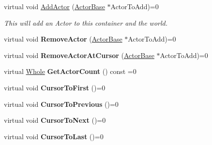\begin{DoxyCompactItemize}
\item 
virtual void \hyperlink{classphys_1_1ActorContainerBase_a8dd213cba4915f68ac421fc9f341cbbe}{AddActor} (\hyperlink{classphys_1_1ActorBase}{ActorBase} $\ast$ActorToAdd)=0
\begin{DoxyCompactList}\small\item\em This will add an Actor to this container and the world. \item\end{DoxyCompactList}\item 
\hypertarget{classphys_1_1ActorContainerBase_a3775dd998c7ed620d4a70b9348d4e067}{
virtual void {\bfseries RemoveActor} (\hyperlink{classphys_1_1ActorBase}{ActorBase} $\ast$ActorToAdd)=0}
\label{d1/d00/classphys_1_1ActorContainerBase_a3775dd998c7ed620d4a70b9348d4e067}

\item 
\hypertarget{classphys_1_1ActorContainerBase_a058d948abcd1bc69a5142e931a67e19b}{
virtual void {\bfseries RemoveActorAtCursor} (\hyperlink{classphys_1_1ActorBase}{ActorBase} $\ast$ActorToAdd)=0}
\label{d1/d00/classphys_1_1ActorContainerBase_a058d948abcd1bc69a5142e931a67e19b}

\item 
\hypertarget{classphys_1_1ActorContainerBase_aa5ec651d4634b2d90efe2a76f9d2fbdd}{
virtual \hyperlink{namespacephys_a460f6bc24c8dd347b05e0366ae34f34a}{Whole} {\bfseries GetActorCount} () const =0}
\label{d1/d00/classphys_1_1ActorContainerBase_aa5ec651d4634b2d90efe2a76f9d2fbdd}

\item 
\hypertarget{classphys_1_1ActorContainerBase_ab1a44758d7c17e70ff2e0f8de47424c3}{
virtual void {\bfseries CursorToFirst} ()=0}
\label{d1/d00/classphys_1_1ActorContainerBase_ab1a44758d7c17e70ff2e0f8de47424c3}

\item 
\hypertarget{classphys_1_1ActorContainerBase_a7c424168c0bbd973b283a083714123b3}{
virtual void {\bfseries CursorToPrevious} ()=0}
\label{d1/d00/classphys_1_1ActorContainerBase_a7c424168c0bbd973b283a083714123b3}

\item 
\hypertarget{classphys_1_1ActorContainerBase_a1aa337456a4e74cb5740dbae08778072}{
virtual void {\bfseries CursorToNext} ()=0}
\label{d1/d00/classphys_1_1ActorContainerBase_a1aa337456a4e74cb5740dbae08778072}

\item 
\hypertarget{classphys_1_1ActorContainerBase_afad072e018a04c190e5e5fb93b82b354}{
virtual void {\bfseries CursorToLast} ()=0}
\label{d1/d00/classphys_1_1ActorContainerBase_afad072e018a04c190e5e5fb93b82b354}


\end{DoxyCompactItemize}
